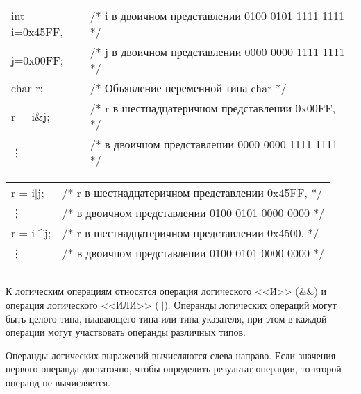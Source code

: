 \begin{pExample}
\begin{tabular}{ l l }
int  i=0x45FF, & \textcolor{exComm}{/* i в двоичном представлении 0100 0101 1111 1111 */} \\
j=0x00FF; & \textcolor{exComm}{/* j в двоичном представлении 0000 0000 1111 1111 */} \\
char r; & \textcolor{exComm}{/* Объявление переменной типа char */} \\
r = i\&j;  & \textcolor{exComm}{/* r в шестнадцатеричном представлении 0x00FF, */} \\
\vdots & \textcolor{exComm}{/* в двоичном представлении 0000 0000 1111 1111 */} \\
\end{tabular}

\begin{tabular}{ l l }
r = i$\vert$j;  & \textcolor{exComm}{/* r в шестнадцатеричном представлении 0x45FF, */} \\
\vdots  & \textcolor{exComm}{/* в двоичном представлении 0100 0101 0000 0000 */} \\
r = i \textasciicircum j;  & \textcolor{exComm}{/* r в шестнадцатеричном представлении 0x4500, */} \\
\vdots  & \textcolor{exComm}{/* в двоичном представлении 0100 0101 0000 0000 */} \\
\end{tabular}
\end{pExample}

\subsection{}

К логическим операциям относятся операция логического <<И>> (\&\&) и операция логического <<ИЛИ>> ($\vert$$\vert$). Операнды логических операций могут быть целого типа, плавающего типа или типа указателя, при этом в каждой операции могут участвовать операнды различных типов. \killoverfullbefore

Операнды логических выражений вычисляются слева направо. Если значения первого операнда достаточно, чтобы определить результат операции, то второй операнд не вычисляется. \killoverfullbefore

